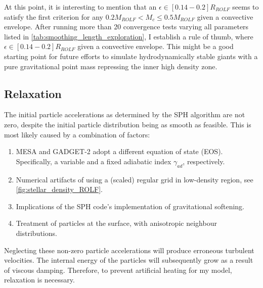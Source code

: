At this point, it is interesting to mention that an $\epsilon \in [0.14-0.2] R_{ROLF}$ seems to satisfy the first criterion for any $0.2M_{ROLF} < M_c \leq 0.5M_{ROLF}$ given a convective envelope. After running more than 20 convergence tests varying all parameters listed in \cref{tab:smoothing_length_exploration}, I establish a rule of thumb, where $\epsilon \in [0.14-0.2] R_{ROLF}$ given a convective envelope. This might be a good starting point for future efforts to simulate hydrodynamically stable giants with a pure gravitational point mass repressing the inner high density zone.


\subsection{Relaxation}

The initial particle accelerations as determined by the SPH algorithm are not zero, despite the initial particle distribution being as smooth as feasible. This is most likely caused by a combination of factors:
\begin{enumerate}
    \item MESA and GADGET-2 adopt a different equation of state (EOS). Specifically, a variable and a fixed adiabatic index $\gamma_{ad}$, respectively.
    \item Numerical artifacts of using a (scaled) regular grid in low-density region, see \cref{fig:stellar_density_ROLF}.
    \item Implications of the SPH code's implementation of gravitational softening.
    \item Treatment of particles at the surface, with anisotropic neighbour distributions.
\end{enumerate}
Neglecting these non-zero particle accelerations will produce erroneous turbulent velocities. The internal energy of the particles will subsequently grow as a result of viscous damping. Therefore, to prevent artificial heating for my model, relaxation is necessary.

